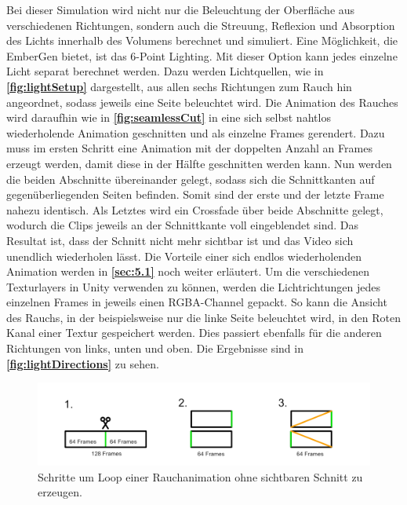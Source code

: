 Bei dieser Simulation wird nicht nur die Beleuchtung der Oberfläche aus verschiedenen Richtungen, sondern auch die Streuung, Reflexion und Absorption des Lichts innerhalb
des Volumens berechnet und simuliert.
Eine Möglichkeit, die EmberGen bietet, ist das 6-Point Lighting.
Mit dieser Option kann jedes einzelne Licht separat berechnet werden. Dazu werden Lichtquellen, wie in \textbf{\autoref{fig:lightSetup}} dargestellt, aus allen sechs Richtungen zum Rauch hin angeordnet,
sodass jeweils eine Seite beleuchtet wird.
Die Animation des Rauches wird daraufhin wie in \textbf{\autoref{fig:seamlessCut}} in eine sich selbst nahtlos wiederholende Animation
geschnitten und als einzelne Frames gerendert. Dazu muss im ersten Schritt eine Animation mit der doppelten Anzahl an Frames erzeugt werden, damit diese in der Hälfte
geschnitten werden kann. Nun werden die beiden Abschnitte übereinander gelegt, sodass sich die Schnittkanten auf gegenüberliegenden Seiten befinden. Somit sind der erste
und der letzte Frame nahezu identisch. Als Letztes wird ein Crossfade über beide Abschnitte gelegt, wodurch die Clips jeweils an der Schnittkante voll eingeblendet
sind. Das Resultat ist, dass der Schnitt nicht mehr sichtbar ist und das Video sich unendlich wiederholen lässt. Die Vorteile einer sich endlos wiederholenden Animation werden in \textbf{\autoref{sec:5.1}}
noch weiter erläutert.
Um die verschiedenen Texturlayers in Unity verwenden zu können, werden die Lichtrichtungen jedes einzelnen Frames in jeweils einen RGBA-Channel gepackt.
So kann die Ansicht des Rauchs, in der beispielsweise nur die linke Seite beleuchtet wird, in den Roten Kanal einer Textur gespeichert werden.
Dies passiert ebenfalls für die anderen Richtungen von links, unten und oben. Die Ergebnisse sind in \textbf{\autoref{fig:lightDirections}} zu sehen.



\begin{figure}[h!]
	\includegraphics[width=\textwidth]{Grafiken/Implementation/Lightmaps/SeamlessCut.png}
	\centering
	\begin{footnotesize}
		\caption{Schritte um Loop einer Rauchanimation ohne sichtbaren Schnitt zu erzeugen. }
		\label{fig:seamlessCut}
	\end{footnotesize}
\end{figure}

